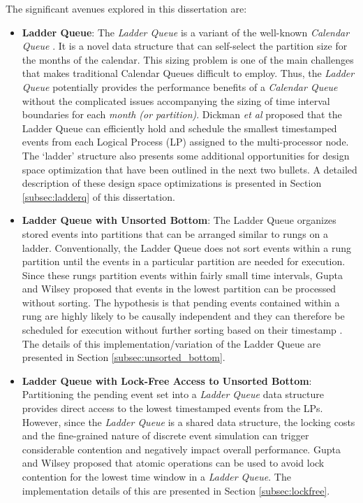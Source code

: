 \documentclass[11pt]{book}
\begin{document}
The significant avenues explored in this dissertation are:

\begin{itemize}

\item \textbf{Ladder Queue}: The \emph{Ladder Queue} \cite{tang-05} is a variant of the well-known
  \emph{Calendar Queue} \cite{brown-88}.  It is a novel data structure that can self-select the partition size
  for the months of the calendar.  This sizing problem is one of the main challenges that makes traditional
  Calendar Queues difficult to employ.  Thus, the \emph{Ladder Queue} \cite{tang-05} potentially provides the
  performance benefits of a \emph{Calendar Queue} without the complicated issues accompanying the sizing of
  time interval boundaries for each \emph{month (or partition)}.  Dickman \emph{et al} \cite{dickman-13}
  proposed that the Ladder Queue can efficiently hold and schedule the smallest timestamped events from each
  Logical Process (LP) assigned to the multi-processor node.  The `ladder' structure also presents some
  additional opportunities for design space optimization that have been outlined in the next two bullets.  A
  detailed description of these design space optimizations is presented in Section \ref{subsec:ladderq} of
  this dissertation.

\item \textbf{Ladder Queue with Unsorted Bottom}: The Ladder Queue organizes stored events into partitions
  that can be arranged similar to rungs on a ladder.  Conventionally, the Ladder Queue does not sort events
  within a rung partition until the events in a particular partition are needed for execution.  Since these
  rungs partition events within fairly small time intervals, Gupta and Wilsey \cite{gupta-14} proposed that
  events in the lowest partition can be processed without sorting.  The hypothesis is that pending events
  contained within a rung are highly likely to be causally independent and they can therefore be scheduled for
  execution without further sorting based on their timestamp \cite{gupta-14}.  The details of this
  implementation/variation of the Ladder Queue are presented in Section \ref{subsec:unsorted_bottom}.

\item \textbf{Ladder Queue with Lock-Free Access to Unsorted Bottom}: Partitioning the pending event set into
  a \emph{Ladder Queue} data structure provides direct access to the lowest timestamped events from the LPs.
  However, since the \emph{Ladder Queue} is a shared data structure, the locking costs and the fine-grained
  nature of discrete event simulation can trigger considerable contention and negatively impact overall
  performance.  Gupta and Wilsey \cite{gupta-14} proposed that atomic operations can be used to avoid lock
  contention for the lowest time window in a \emph{Ladder Queue}.  The implementation details of this are
  presented in Section \ref{subsec:lockfree}.


\end{itemize}
\end{document}
